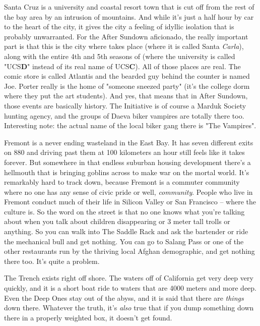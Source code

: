 Santa Cruz is a university and coastal resort town that is cut off from the rest of the bay area by an intrusion of mountains. And while it's just a half hour by car to the heart of the city, it gives the city a feeling of idyllic isolation that is probably unwarranted. For the After Sundown aficionado, the really important part is that this is the city where  takes place (where it is called Santa \textit{Carla}), along with the entire 4th and 5th seasons of  (where the university is called "UCS\textbf{D}" instead of its real name of UCS\textbf{C}). All of those places are real. The comic store is called Atlantis and the bearded guy behind the counter is named Joe. Porter really is the home of "someone sneezed party" (it's the college dorm where they put the art students). And yes, that means that in After Sundown, those events are basically history. The Initiative is of course a Marduk Society hunting agency, and the groups of Daeva biker vampires are totally there too. Interesting note: the actual name of the local biker gang there is "The Vampires".

Fremont is a never ending wasteland in the East Bay. It has seven different exits on 880 and driving past them at 100 kilometers an hour still feels like it takes forever. But somewhere in that endless suburban housing development there's a hellmouth that is bringing goblins across to make war on the mortal world. It's remarkably hard to track down, because Fremont is a commuter community where no one has any sense of civic pride or well, \textit{community}. People who live in Fremont conduct much of their life in Silicon Valley or San Francisco -- where the culture is. So the word on the street is that no one knows what you're talking about when you talk about children disappearing or 3 meter tall trolls or anything. So you can walk into The Saddle Rack and ask the bartender or ride the mechanical bull and get nothing. You can go to Salang Pass or one of the other restaurants run by the thriving local Afghan demographic, and get nothing there too. It's quite a problem.

The Trench exists right off shore. The waters off of California get very deep very quickly, and it is a short boat ride to waters that are 4000 meters and more deep. Even the Deep Ones stay out of the abyss, and it is said that there are \textit{things} down there. Whatever the truth, it's \textit{also} true that if you dump something down there in a properly weighted box, it doesn't get found.

